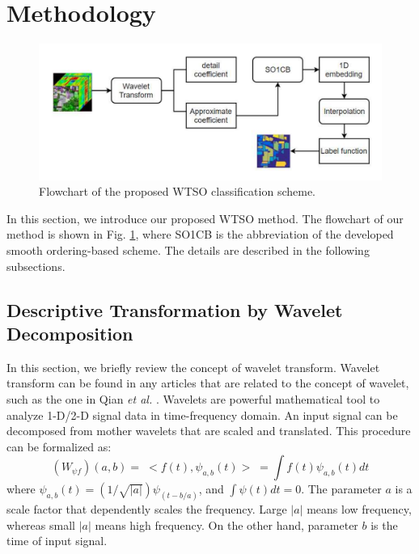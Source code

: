 \documentclass{ws-ijwmip}
\begin{document}
\section{Methodology}\label{sec:proposed}
\begin{figure}[bh]
	\centerline{\includegraphics[width=13cm]{image/flow1}}
	\vspace*{8pt}
	\caption{Flowchart of the proposed WTSO classification scheme.}
	\label{figure1}
\end{figure}
In this section, we introduce our proposed  WTSO method. The flowchart of our method is shown in Fig. \ref{figure1}, where SO1CB is the abbreviation of the developed smooth ordering-based scheme. %
The details are described in the following subsections.


\subsection{Descriptive Transformation by Wavelet Decomposition}
In this section, we briefly review the concept of wavelet transform.
Wavelet transform can be found in any articles that are related to the concept of wavelet, such as the one in Qian \textit{et al.} \cite{29}. 
Wavelets are powerful mathematical tool to analyze 1-D/2-D signal data in time-frequency domain.
An input signal can be decomposed from mother wavelets that are scaled and translated. 
This procedure can be formalized as: %
\begin{equation}
(W_{\psi f})(a,b) = \;<f(t),\psi _{a,b} (t)>\; = \int f(t)\psi _{a,b} (t)dt
\label{equ2.1}
\end{equation}
where $\psi_{a,b}(t) = (1/\sqrt{|a|})\psi_{(t-b/{a})}$, and $\int \psi (t)dt=0$. 
The parameter $a$ is a scale factor that dependently scales the frequency.
Large $| a |$ means low frequency, whereas small $| a|$ means high frequency.
On the other hand, parameter $b$ is the time of input signal. 
\end{document}
